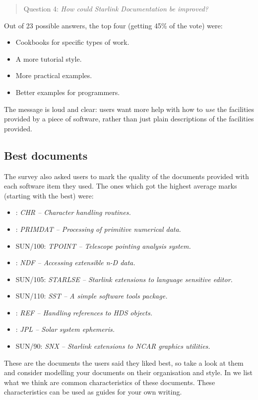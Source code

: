 \documentclass[twoside,11pt,nolof]{starlink}
\begin{document}
\begin{quote}
Question 4: \emph{How could Starlink Documentation be improved?}
\end{quote}

Out of 23 possible answers, the top four (getting 45\% of the vote) were:
\begin{itemize}
\item Cookbooks for specific types of work.
\item A more tutorial style.
\item More practical examples.
\item Better examples for programmers.
\end{itemize}

The message is loud and clear: users want more help with how to \emph{use}
the facilities provided by a piece of software, rather than just plain
descriptions of the facilities provided.

\subsection{\label{BestDocs}Best documents}

The survey also asked users to mark the quality of the documents provided with
each software item they used.
The ones which got the highest average marks (starting with the best) were:
\begin{itemize}
\item {}: \emph{CHR -- Character handling routines.}
\item {}: \emph{PRIMDAT -- Processing of primitive numerical data.}
\item SUN/100: \emph{TPOINT -- Telescope pointing analysis system.}
\item {}: \emph{NDF -- Accessing extensible n-D data.}
\item SUN/105: \emph{STARLSE -- Starlink extensions to language sensitive editor.}
\item SUN/110: \emph{SST -- A simple software tools package.}
\item {}: \emph{REF -- Handling references to HDS objects.}
\item {}: \emph{JPL -- Solar system ephemeris.}
\item SUN/90: \emph{SNX -- Starlink extensions to NCAR graphics utilities.}
\end{itemize}
These are the documents the users said they liked best, so take a look at them
and consider modelling your documents on their organisation and style.
In  we list what we think are common
characteristics of these documents.
These characteristics can be used as guides for your own writing.
\end{document}
